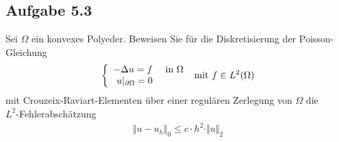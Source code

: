\subsection{Aufgabe 5.3}
Sei $\Omega$ ein konvexes Polyeder. Beweisen Sie für die Diskretisierung der Poisson-Gleichung
\begin{align*}
	\left\lbrace\begin{array}{rl}
		-\Delta u=f &\text{ in }\Omega\\
		u|_{\partial\Omega}=0
	\end{array}\right.\mit f\in L^2(\Omega)
\end{align*}
mit Crouzeix-Raviart-Elementen über einer regulären Zerlegung von $\Omega$ die \\$L^2$-Fehlerabschätzung
\begin{align*}
	\Vert u-u_h\Vert_0\leq c\cdot h^2\cdot\Vert u\Vert_2
\end{align*}

